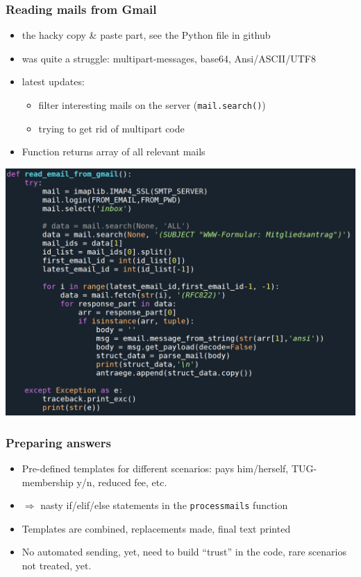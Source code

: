 \documentclass[12pt,ngerman]{beamer}
\begin{document}
\begin{frame}
\frametitle{Reading mails from Gmail}

\begin{itemize}
\item the hacky copy \& paste part,  see the Python file in github
\item was quite a struggle: multipart-messages, base64, Ansi/ASCII/UTF8
\item latest updates:

\begin{itemize}
	\item filter interesting mails on the server (\texttt{mail.search()})
	\item trying to get rid of multipart code
\end{itemize}

\item Function returns array of all relevant mails

\end{itemize}
\end{frame}

\begin{frame}

\begin{center}
\hspace*{-1em}\includegraphics[width=1.1\textwidth]{readmails}
\end{center}

\end{frame}

\begin{frame}
\frametitle{Preparing answers}

\begin{itemize}
\item Pre-defined templates for different scenarios: pays him/herself, TUG-membership y/n, reduced fee, etc.
\item $\Rightarrow$ nasty if/elif/else statements in the \texttt{process\textunderscore mails} function
\item Templates are combined, replacements made, final text printed
\item No automated sending, yet, need to build \enquote{trust} in the code, rare scenarios not treated, yet.
\end{itemize}
\end{frame}
\end{document}
